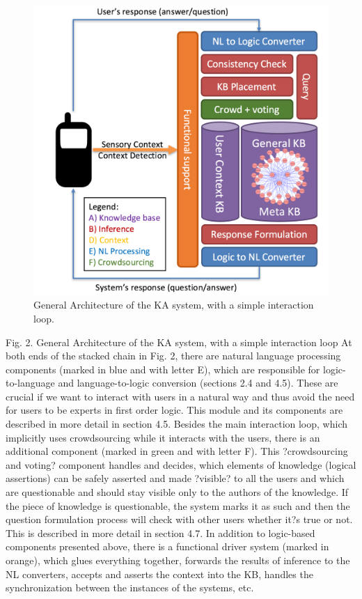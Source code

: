  \begin{figure}[htb]
	\centering
		\includegraphics[width=1\textwidth]{figures/architecture.png}
	\caption{General Architecture of the KA system, with a simple interaction loop.}
	\label{fig:Architecture}
\end{figure}

Fig. 2. General Architecture of the KA system, with a simple interaction loop
At both ends of the stacked chain in Fig. 2, there are natural language processing components (marked in blue and with letter E), which are responsible for logic-to-language and language-to-logic conversion (sections 2.4 and 4.5). These are crucial if we want to interact with users in a natural way and thus avoid the need for users to be experts in first order logic. This module and its components are described in more detail in section 4.5.  
Besides the main interaction loop, which implicitly uses crowdsourcing while it interacts with the users, there is an additional component (marked in green and with letter F). This ?crowdsourcing and voting? component handles and decides, which elements of knowledge (logical assertions) can be safely asserted and made ?visible? to all the users and which are questionable and should stay visible only to the authors of the knowledge. If the piece of knowledge is questionable, the system marks it as such and then the question formulation process will check with other users whether it?s true or not. This is described in more detail in section 4.7.
In addition to logic-based components presented above, there is a functional driver system (marked in orange), which glues everything together, forwards the results of inference to the NL converters, accepts and asserts the context into the KB, handles the synchronization between the instances of the systems, etc.
